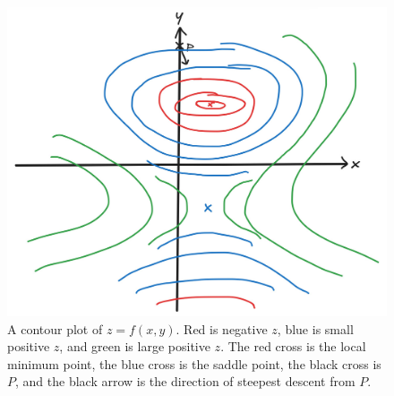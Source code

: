 \documentclass[a4paper]{article}
\begin{document}
\begin{figure}[h]
	\centering
	\includegraphics[scale=0.4]{Q2c}
	\caption{A contour plot of $z=f(x,y)$. Red is negative $z$, blue is small positive $z$, and green is large positive $z$. The red cross is the local minimum point, the blue cross is the saddle point, the black cross is $P$, and the black arrow is the direction of steepest descent from $P$.}
\end{figure}

\subsection{~}
\end{document}
